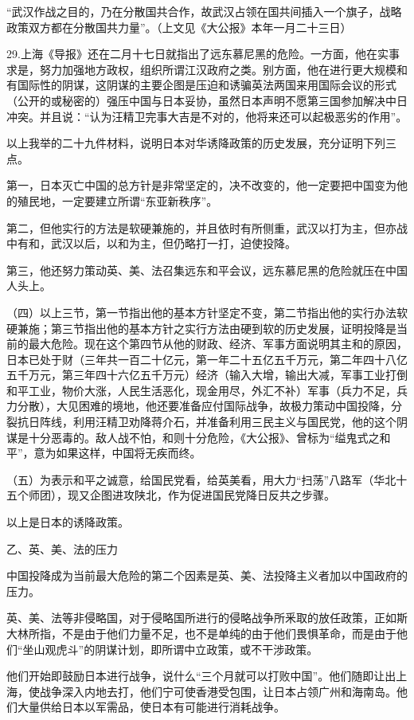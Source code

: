 “武汉作战之目的，乃在分散国共合作，故武汉占领在国共间插入一个旗子，战略政策双方都在分散国共力量”。（上文见《大公报》本年一月二十三日）

29.上海《导报》还在二月十七日就指出了远东慕尼黑的危险。一方面，他在实事求是，努力加强地方政权，组织所谓江汉政府之类。别方面，他在进行更大规模和有国际性的阴谋，这阴谋的主要企图是压迫和诱骗英法两国来用国际会议的形式（公开的或秘密的）强压中国与日本妥协，虽然日本声明不愿第三国参加解决中日冲突。并且说：“认为汪精卫完事大吉是不对的，他将来还可以起极恶劣的作用”。

以上我举的二十九件材料，说明日本对华诱降政策的历史发展，充分证明下列三点。

第一，日本灭亡中国的总方针是非常坚定的，决不改变的，他一定要把中国变为他的殖民地，一定要建立所谓“东亚新秩序”。

第二，但他实行的方法是软硬兼施的，并且依时有所侧重，武汉以打为主，但亦战中有和，武汉以后，以和为主，但仍略打一打，迫使投降。

第三，他还努力策动英、美、法召集远东和平会议，远东慕尼黑的危险就压在中国人头上。

（四）以上三节，第一节指出他的基本方针坚定不变，第二节指出他的实行办法软硬兼施；第三节指出他的基本方针之实行方法由硬到软的历史发展，证明投降是当前的最大危险。现在这个第四节从他的财政、经济、军事方面说明其主和的原因，日本已处于财（三年共一百二十亿元，第一年二十五亿五千万元，第二年四十八亿五千万元，第三年四十六亿五千万元）经济（输入大增，输出大减，军事工业打倒和平工业，物价大涨，人民生活恶化，现金用尽，外汇不补）军事（兵力不足，兵力分散），大见困难的境地，他还要准备应付国际战争，故极力策动中国投降，分裂抗日阵线，利用汪精卫劝降蒋介石，并准备利用三民主义与国民党，他的这个阴谋是十分恶毒的。敌人战不怕，和则十分危险，《大公报》、曾标为“缢鬼式之和平”，意为如果这样，中国将无疾而终。

（五）为表示和平之诚意，给国民党看，给英美看，用大力“扫荡”八路军（华北十五个师团），现又企图进攻陕北，作为促进国民党降日反共之步骤。

以上是日本的诱降政策。

乙、英、美、法的压力

中国投降成为当前最大危险的第二个因素是英、美、法投降主义者加以中国政府的压力。

英、美、法等非侵略国，对于侵略国所进行的侵略战争所釆取的放任政策，正如斯大林所指，不是由于他们力量不足，也不是单纯的由于他们畏惧革命，而是由于他们“坐山观虎斗”的阴谋计划，即所谓中立政策，或不干涉政策。

他们开始即鼓励日本进行战争，说什么“三个月就可以打败中国”。他们随即让出上海，使战争深入内地去打，他们宁可使香港受包围，让日本占领广州和海南岛。他们大量供给日本以军需品，使日本有可能进行消耗战争。

